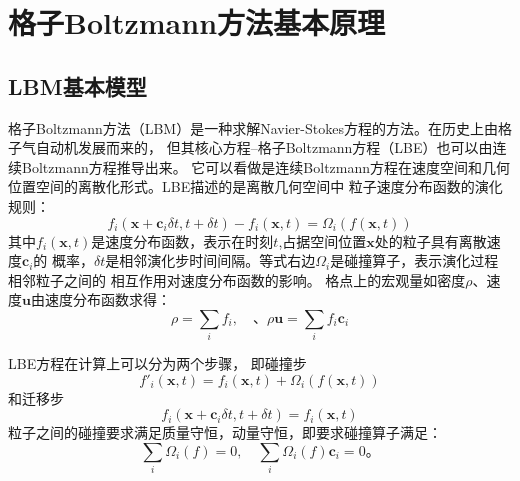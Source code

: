 \chapter{格子Boltzmann方法基本原理}\label{chp:LBM}

\section{LBM基本模型}
格子Boltzmann方法（LBM）是一种求解Navier-Stokes方程的方法。在历史上由格子气自动机发展而来的，
但其核心方程\---格子Boltzmann方程（LBE）也可以由连续Boltzmann方程推导出来。
它可以看做是连续Boltzmann方程在速度空间和几何位置空间的离散化形式。LBE描述的是离散几何空间中
粒子速度分布函数的演化规则：
\begin{equation}
  f_i(\bm{x}+\bm{c}_i\delta t,t+\delta t) - f_i(\bm{x},t) = \Omega_i\left(f(\bm x, t)\right)
  \label{lbe}
\end{equation}
其中$f_i(\bm x,t)$是速度分布函数，表示在时刻$t$,占据空间位置$\bm{x}$处的粒子具有离散速度$\bm{c}_i$的
概率，$\delta t$是相邻演化步时间间隔。等式右边$\Omega_i$是碰撞算子，表示演化过程相邻粒子之间的
相互作用对速度分布函数的影响。
格点上的宏观量如密度$\rho$、速度$\bm u$由速度分布函数求得：
\begin{equation}
  \rho = \sum_i f_i, \quad 、\rho\bm u = \sum_i f_i \bm c_i
  \label{macro}
\end{equation}

LBE方程在计算上可以分为两个步骤，
即碰撞步
\begin{equation}
  f'_i(\bm x, t) = f_i(\bm{x},t) + \Omega_i\left(f(\bm x, t)\right)
  \label{lbe-collision}
\end{equation}
和迁移步
\begin{equation}
 f_i(\bm{x}+\bm{c}_i\delta t,t+\delta t) = f_i(\bm{x},t)
  \label{lbe-stream}
\end{equation}
粒子之间的碰撞要求满足质量守恒，动量守恒，即要求碰撞算子满足：
\begin{equation}
 \sum_i \Omega_i(f) = 0, \quad \sum_i \Omega_i(f)\bm c_i = 0。
  \label{conservation}
\end{equation}

